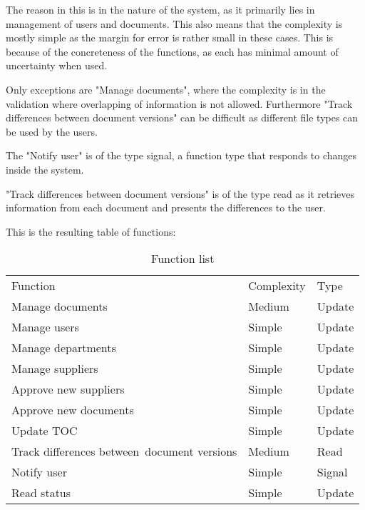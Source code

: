 The reason in this is in the nature of the system, as it primarily lies in management of users and documents.
This also means that the complexity is mostly simple as the margin for error is rather small in these cases. This is because of the concreteness of the functions, as each has minimal amount of uncertainty when used.

Only exceptions are "Manage documents", where the complexity is in the validation where overlapping of information is not allowed.
Furthermore "Track differences between document versions" can be difficult as different file types can be used by the users.

The "Notify user" is of the type signal, a function type that responds to changes inside the system.

"Track differences between document versions" is of the type read as it retrieves information from each document and presents the differences to the user.

This is the resulting table of functions:
\begin{table}[H]
\centering
\begin{tabular}{lll}
Function                                    & Complexity & Type    \\
Manage documents                            & Medium     & Update  \\
Manage users                                & Simple     & Update  \\
Manage departments                          & Simple     & Update  \\
Manage suppliers                            & Simple     & Update  \\
Approve new suppliers                       & Simple     & Update  \\
Approve new documents                       & Simple     & Update  \\
Update TOC                                  & Simple     & Update  \\
Track differences between~document versions & Medium     & Read    \\
Notify user                                 & Simple     & Signal  \\
Read status                                 & Simple     & Update
\end{tabular}
\caption{Function list}
\end{table}

